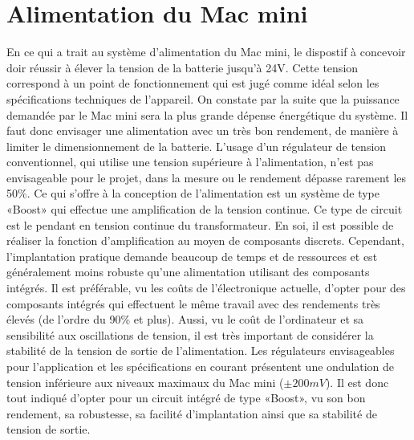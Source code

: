 \section{Alimentation du Mac mini} \label{s:alim_mac_mini}
En ce qui a trait au système d'alimentation du Mac mini, le dispostif à concevoir doir réussir à élever la tension de la batterie jusqu'à 24V. Cette tension correspond à un point de fonctionnement qui est jugé comme idéal selon les spécifications techniques de l'appareil. On constate par la suite que la puissance demandée par le Mac mini sera la plus grande dépense énergétique du système. Il faut donc envisager une alimentation avec un très bon rendement, de manière à limiter le dimensionnement de la batterie. L'usage d'un régulateur de tension conventionnel, qui utilise une tension supérieure à l'alimentation, n'est pas envisageable pour le projet, dans la mesure ou le rendement dépasse rarement les 50\%. Ce qui s'offre à la conception de l'alimentation est un système de type «Boost» qui effectue une amplification de la tension continue. Ce type de circuit est le pendant en tension continue du transformateur. En soi, il est possible de réaliser la fonction d'amplification au moyen de composants discrets. Cependant, l'implantation pratique demande beaucoup de temps et de ressources et est généralement moins robuste qu'une alimentation utilisant des composants intégrés. Il est préférable, vu les coûts de l'électronique actuelle, d'opter pour des composants intégrés qui effectuent le même travail avec des rendements très élevés (de l'ordre du 90\% et plus). Aussi, vu le coût de l'ordinateur et sa sensibilité aux oscillations de tension, il est très important de considérer la stabilité de la tension de sortie de l'alimentation. Les régulateurs envisageables pour l'application et les spécifications en courant présentent une ondulation de tension inférieure aux niveaux maximaux du Mac mini ($\pm 200mV$). Il est donc tout indiqué d'opter pour un circuit intégré de type «Boost», vu son bon rendement, sa robustesse, sa facilité d'implantation ainsi que sa stabilité de tension de sortie.

